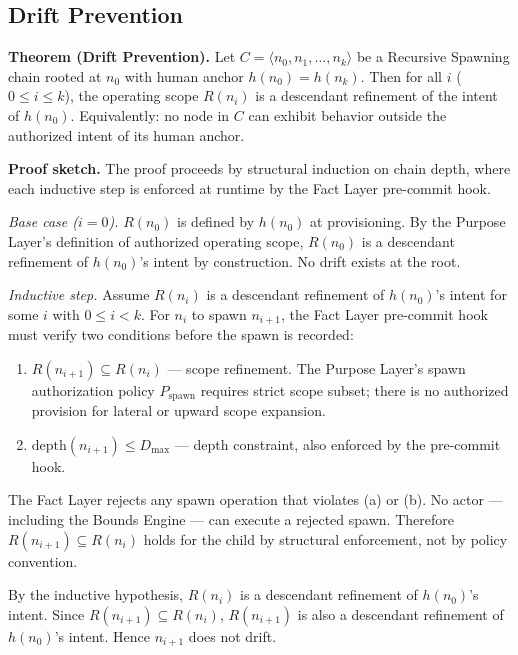 \subsection{Drift Prevention}
\label{sec:rs-drift-prevention}

\medskip
\noindent\textbf{Theorem (Drift Prevention).} Let $C = \langle n_0, n_1, \ldots, n_k \rangle$ be a Recursive Spawning chain rooted at $n_0$ with human anchor $h(n_0) = h(n_k)$. Then for all $i$ ($0 \leq i \leq k$), the operating scope $R(n_i)$ is a descendant refinement of the intent of $h(n_0)$. Equivalently: no node in $C$ can exhibit behavior outside the authorized intent of its human anchor.

\medskip
\noindent\textbf{Proof sketch.} The proof proceeds by structural induction on chain depth, where each inductive step is enforced at runtime by the Fact Layer pre-commit hook.

\medskip
\textit{Base case ($i=0$).} $R(n_0)$ is defined by $h(n_0)$ at provisioning. By the Purpose Layer's definition of authorized operating scope, $R(n_0)$ is a descendant refinement of $h(n_0)$'s intent by construction. No drift exists at the root.

\medskip
\textit{Inductive step.} Assume $R(n_i)$ is a descendant refinement of $h(n_0)$'s intent for some $i$ with $0 \leq i < k$. For $n_i$ to spawn $n_{i+1}$, the Fact Layer pre-commit hook must verify two conditions before the spawn is recorded:

\begin{enumerate}
    \item[(a)] $R(n_{i+1}) \subseteq R(n_i)$ — scope refinement. The Purpose Layer's spawn authorization policy $P_{\mathrm{spawn}}$ requires strict scope subset; there is no authorized provision for lateral or upward scope expansion.
    \item[(b)] $\mathrm{depth}(n_{i+1}) \leq D_{\mathrm{max}}$ — depth constraint, also enforced by the pre-commit hook.
\end{enumerate}

The Fact Layer rejects any spawn operation that violates (a) or (b). No actor — including the Bounds Engine — can execute a rejected spawn. Therefore $R(n_{i+1}) \subseteq R(n_i)$ holds for the child by structural enforcement, not by policy convention.

By the inductive hypothesis, $R(n_i)$ is a descendant refinement of $h(n_0)$'s intent. Since $R(n_{i+1}) \subseteq R(n_i)$, $R(n_{i+1})$ is also a descendant refinement of $h(n_0)$'s intent. Hence $n_{i+1}$ does not drift.

